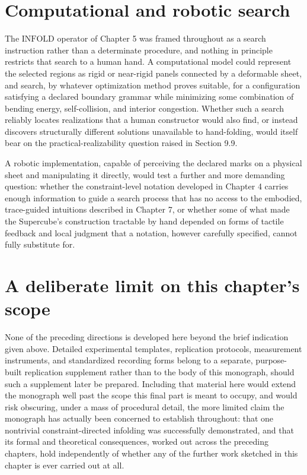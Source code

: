 \documentclass[11pt,oneside]{book}
\begin{document}
\hypertarget{computational-and-robotic-search}{%
\section{Computational and robotic
search}\label{computational-and-robotic-search}}

The \(\text{INFOLD}\) operator of Chapter 5 was framed throughout as a
search instruction rather than a determinate procedure, and nothing in
principle restricts that search to a human hand. A computational model
could represent the selected regions as rigid or near-rigid panels
connected by a deformable sheet, and search, by whatever optimization
method proves suitable, for a configuration satisfying a declared
boundary grammar while minimizing some combination of bending energy,
self-collision, and interior congestion. Whether such a search reliably
locates realizations that a human constructor would also find, or
instead discovers structurally different solutions unavailable to
hand-folding, would itself bear on the practical-realizability question
raised in Section 9.9.

A robotic implementation, capable of perceiving the declared marks on a
physical sheet and manipulating it directly, would test a further and
more demanding question: whether the constraint-level notation developed
in Chapter 4 carries enough information to guide a search process that
has no access to the embodied, trace-guided intuitions described in
Chapter 7, or whether some of what made the Supercube's construction
tractable by hand depended on forms of tactile feedback and local
judgment that a notation, however carefully specified, cannot fully
substitute for.

\hypertarget{a-deliberate-limit-on-this-chapters-scope}{%
\section{A deliberate limit on this chapter's
scope}\label{a-deliberate-limit-on-this-chapters-scope}}

None of the preceding directions is developed here beyond the brief
indication given above. Detailed experimental templates, replication
protocols, measurement instruments, and standardized recording forms
belong to a separate, purpose-built replication supplement rather than
to the body of this monograph, should such a supplement later be
prepared. Including that material here would extend the monograph well
past the scope this final part is meant to occupy, and would risk
obscuring, under a mass of procedural detail, the more limited claim the
monograph has actually been concerned to establish throughout: that one
nontrivial constraint-directed infolding was successfully demonstrated,
and that its formal and theoretical consequences, worked out across the
preceding chapters, hold independently of whether any of the further
work sketched in this chapter is ever carried out at all.
\end{document}
